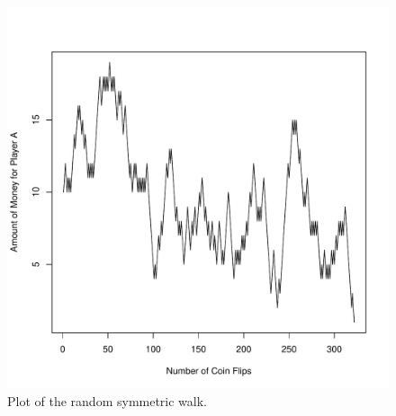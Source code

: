 \documentclass{article}\usepackage[]{graphicx}\usepackage[]{color}
\makeatletter
\def\maxwidth{ %
  \ifdim\Gin@nat@width>\linewidth
    \linewidth
  \else
    \Gin@nat@width
  \fi
}
\newenvironment{knitrout}{}{} %
\makeatother
\begin{document}
\begin{itemize}
\begin{figure}
\begin{knitrout}
\color{fgcolor}
\includegraphics[width=\maxwidth]{figure/walkplot} 

\end{knitrout}

\caption{Plot of the random symmetric walk.}
\label{walk}
\end{figure}
\end{itemize}
\end{document}
